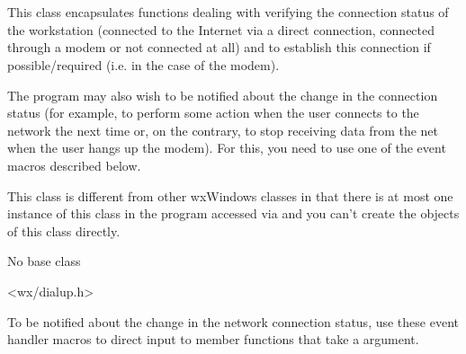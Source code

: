 
\section{}\label{wxdialupmanager}

This class encapsulates functions dealing with verifying the connection status
of the workstation (connected to the Internet via a direct connection,
connected through a modem or not connected at all) and to establish this
connection if possible/required (i.e. in the case of the modem).

The program may also wish to be notified about the change in the connection
status (for example, to perform some action when the user connects to the
network the next time or, on the contrary, to stop receiving data from the net
when the user hangs up the modem). For this, you need to use one of the event
macros described below.

This class is different from other wxWindows classes in that there is at most
one instance of this class in the program accessed via 
 and you can't
create the objects of this class directly.


No base class


<wx/dialup.h>


To be notified about the change in the network connection status, use these
event handler macros to direct input to member functions that take a 
 argument.

\twocolwidtha{7cm}
\begin{twocollist}\itemsep=0pt
\end{twocollist}%

